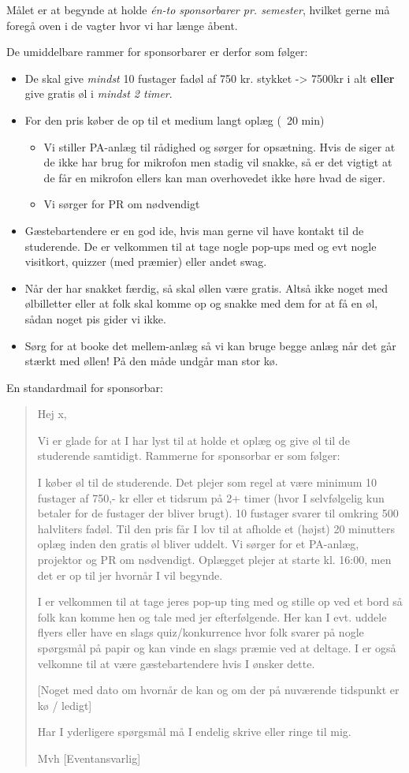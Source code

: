 Målet er at begynde at holde \emph{én-to sponsorbarer pr. semester},
hvilket gerne må foregå oven i de vagter hvor vi har længe åbent.

De umiddelbare rammer for sponsorbarer er derfor som følger:
\begin{itemize}
\item De skal give \textit{mindst} 10 fustager fadøl af 750 kr. stykket -> 7500kr i
  alt \textbf{eller} give gratis øl i \textit{mindst 2 timer}.
\item For den pris køber de op til et medium langt oplæg (~20 min)
  \begin{itemize}
  \item Vi stiller PA-anlæg til rådighed og sørger for opsætning. Hvis de siger at de ikke har brug for mikrofon men stadig vil snakke, så er det vigtigt at de får en mikrofon ellers kan man overhovedet ikke høre hvad de siger.
  \item Vi sørger for PR om nødvendigt
  \end{itemize}
\item Gæstebartendere er en god ide, hvis man gerne vil have kontakt
  til de studerende. De er velkommen til at tage nogle pop-ups med og evt nogle visitkort, quizzer (med præmier) eller andet swag.
\item Når der har snakket færdig, så skal øllen være gratis. Altså ikke noget med ølbilletter eller at folk skal komme op og snakke med dem for at få en øl, sådan noget pis gider vi ikke.
\item Sørg for at booke det mellem-anlæg så vi kan bruge begge anlæg når det går stærkt med øllen! På den måde undgår man stor kø.
\end{itemize}


En standardmail for sponsorbar:
\begin{quote}
Hej x,

Vi er glade for at I har lyst til at holde et oplæg og give øl til de studerende samtidigt. Rammerne for sponsorbar er som følger:

I køber øl til de studerende. Det plejer som regel at være minimum 10 fustager af 750,- kr eller et tidsrum på 2+ timer (hvor I selvfølgelig kun betaler for de fustager der bliver brugt). 10 fustager svarer til omkring 500 halvliters fadøl. Til den pris får I lov til at afholde et (højst) 20 minutters oplæg inden den gratis øl bliver uddelt. Vi sørger for et PA-anlæg, projektor og PR om nødvendigt. Oplægget plejer at starte kl. 16:00, men det er op til jer hvornår I vil begynde.

I er velkommen til at tage jeres pop-up ting med og stille op ved et bord så folk kan komme hen og tale med jer efterfølgende. Her kan I evt. uddele flyers eller have en slags quiz/konkurrence hvor folk svarer på nogle spørgsmål på papir og kan vinde en slags præmie ved at deltage. I er også velkomne til at være gæstebartendere hvis I ønsker dette.


[Noget med dato om hvornår de kan og om der på nuværende tidspunkt er kø / ledigt]


Har I yderligere spørgsmål må I endelig skrive eller ringe til mig.

Mvh [Eventansvarlig]
\end{quote}


